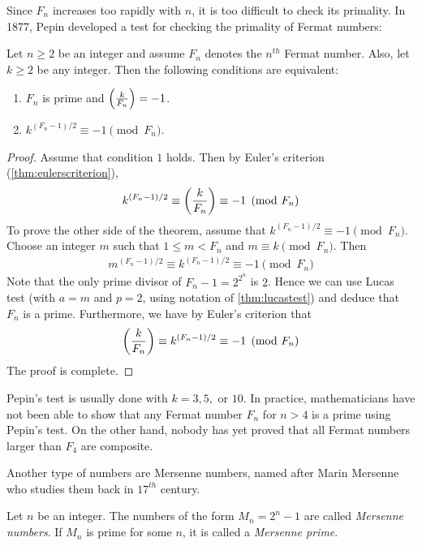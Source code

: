 \documentclass{subfiles}
\begin{document}
	Since $F_n$ increases too rapidly with $n$, it is too difficult to check its primality. In 1877, Pepin developed a test for checking the primality of Fermat numbers:

		\begin{theorem}
			Let $n \geq 2$ be an integer and assume $F_n$ denotes the $n^{th}$ Fermat number. Also, let $k \geq 2$ be any integer. Then the following conditions are equivalent:
				\begin{enumerate}[1.]
					\item $F_n$ is prime and $\func{}{\frac{k}{F_n}}=-1$.
					\item $k^{(F_n-1)/2} \equiv -1 \pmod{F_n}$.
				\end{enumerate}
		\end{theorem}

		\begin{proof}
			Assume that condition $1$ holds. Then by Euler's criterion (\autoref{thm:eulerscriterion}),
				\begin{align*}
					k^{(F_n-1)/2} \equiv \func{}{\dfrac{k}{F_n}} \equiv -1 \pmod{F_n}
				\end{align*}
			To prove the other side of the theorem, assume that $k^{(F_n-1)/2} \equiv -1 \pmod{F_n}$. Choose an integer $m$ such that $1 \leq  m <F_n$ and $m \equiv k \pmod{F_n}$. Then
				\begin{align*}
					m^{(F_n-1)/2} \equiv k^{(F_n-1)/2} \equiv -1 \pmod{F_n}
				\end{align*}
			Note that the only prime divisor of $F_n-1 = 2^{2^n}$ is $2$. Hence we can use Lucas test (with $a=m$ and $p=2$, using notation of \autoref{thm:lucastest}) and deduce that $F_n$ is a prime. Furthermore, we have by Euler's criterion that
				\begin{align*}
					\func{}{\dfrac{k}{F_n}} \equiv	k^{(F_n-1)/2}  \equiv -1 \pmod{F_n}
				\end{align*}
			The proof is complete.
		\end{proof}

	Pepin's test is usually done with $k=3, 5,$ or $10$. In practice, mathematicians have not been able to show that any Fermat number $F_n$ for $n>4$ is a prime using Pepin's test. On the other hand, nobody has yet proved that all Fermat numbers larger than $F_4$ are composite.

	Another type of numbers are Mersenne numbers, named after Marin Mersenne who studies them back in $17^{th}$ century.
		\begin{definition}
			Let $n$ be an integer. The numbers of the form $M_n = 2^n -1$ are called \textit{Mersenne numbers}. If $M_n$ is prime for some $n$, it is called a \textit{Mersenne prime}.
		\end{definition}
\end{document}
